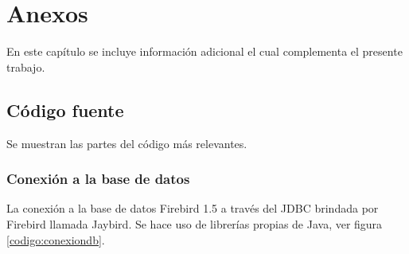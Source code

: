 \chapter{Anexos}
En este capítulo se incluye información adicional el cual complementa el presente trabajo.
\section{Código fuente}
Se muestran las partes del código más relevantes.
\subsection{Conexión a la base de datos}
\label{anexo:conexiondb}
La conexión a la base de datos Firebird 1.5 a través del JDBC brindada por Firebird llamada Jaybird. Se hace uso de librerías propias de Java, ver figura \ref{codigo:conexiondb}.

